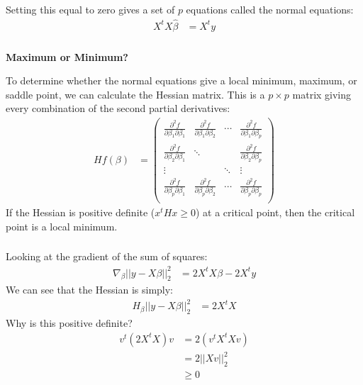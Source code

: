 \documentclass[xetex,mathserif,serif,aspectratio=169]{beamer}
\begin{document}
\begin{frame}[fragile] \frametitle{} \oldB \small

Setting this equal to zero gives a set of $p$ equations called
the normal equations:
\begin{align*}
X^t X \widehat{\beta} &= X^t y
\end{align*}

\end{frame}

\begin{frame}[fragile] \frametitle{} \oldB \small

{\bf Maximum or Minimum?}

To determine whether the normal equations give a local minimum, maximum, or
saddle point, we can calculate the Hessian matrix.
\pause This is a $p \times p$ matrix giving every combination of the
second partial derivatives:
\begin{align*}
H f(\beta) &=
  \left(\begin{array}{cccc}\frac{\partial^2f}{\partial \beta_1 \partial \beta_1}&\frac{\partial^2f}{\partial \beta_1 \partial \beta_2}&\cdots&\frac{\partial^2f}{\partial \beta_1 \partial \beta_p}\\
                           \frac{\partial^2f}{\partial \beta_2 \partial \beta_1}&\ddots&&\frac{\partial^2f}{\partial \beta_2 \partial \beta_p}\\
                           \vdots&&\ddots&\vdots\\
                           \frac{\partial^2f}{\partial \beta_p \partial \beta_1}&\frac{\partial^2f}{\partial \beta_p \partial \beta_2}&\cdots&\frac{\partial^2f}{\partial \beta_p \partial \beta_p}\\\end{array}\right)
\end{align*}
If the Hessian is positive definite ($x^t H x \geq 0$) at a critical point,
then the critical point is a local minimum.

\end{frame}

\begin{frame}[fragile] \frametitle{} \oldB \small

Looking at the gradient of the sum of squares:
\begin{align*}
\nabla_\beta ||y - X \beta ||_2^2 &= 2 X^t X \beta - 2 X^t y
\end{align*}
\pause We can see that the Hessian is simply:
\begin{align*}
H_\beta ||y - X \beta ||_2^2 &= 2 X^t X
\end{align*}
\pause Why is this positive definite? \pause
\begin{align*}
v^t \left(2 X^tX \right) v &= 2 \left( v^t X^t X v\right) \\
&= 2 || X v ||_2^2 \\
&\geq 0
\end{align*}

\end{frame}
\end{document}
